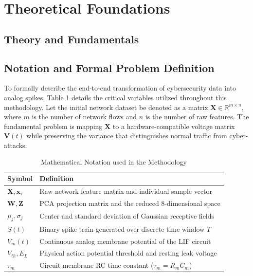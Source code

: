 \documentclass{ieeeaccess}
\begin{document}
\section{Theoretical Foundations}
\subsection{Theory and Fundamentals}

\subsection{Notation and Formal Problem Definition}
To formally describe the end-to-end transformation of cybersecurity data into analog spikes, Table \ref{tab:notation} details the critical variables utilized throughout this methodology. Let the initial network dataset be denoted as a matrix $\mathbf{X} \in \mathbb{R}^{m \times n}$, where $m$ is the number of network flows and $n$ is the number of raw features. The fundamental problem is mapping $\mathbf{X}$ to a hardware-compatible voltage matrix $\mathbf{V}(t)$ while preserving the variance that distinguishes normal traffic from cyber-attacks.

\begin{table}[!t]
\centering
\caption{Mathematical Notation used in the Methodology}
\label{tab:notation}
\begin{tabular}{|p{}|p{}|}
\hline
\textbf{Symbol} & \textbf{Definition} \\
\hline
$\mathbf{X}, \mathbf{x}_i$ & Raw network feature matrix and individual sample vector \\
\hline
$\mathbf{W}, \mathbf{Z}$ & PCA projection matrix and the reduced 8-dimensional space \\
\hline
$\mu_j, \sigma_j$ & Center and standard deviation of Gaussian receptive fields \\
\hline
$S(t)$ & Binary spike train generated over discrete time window $T$ \\
\hline
$V_m(t)$ & Continuous analog membrane potential of the LIF circuit \\
\hline
$V_{th}, E_L$ & Physical action potential threshold and resting leak voltage \\
\hline
$\tau_m$ & Circuit membrane RC time constant ($\tau_m = R_m C_m$) \\
\hline
\end{tabular}
\end{table}
\end{document}
